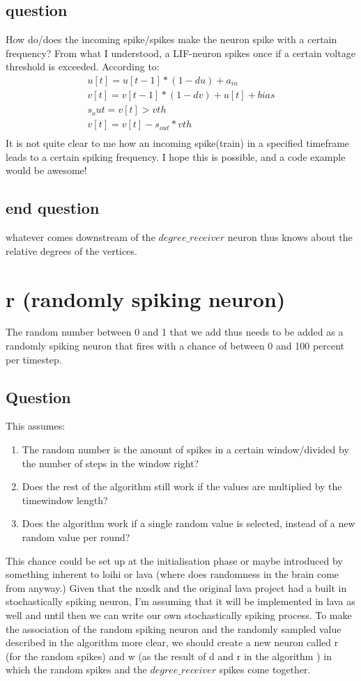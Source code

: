 \subsection{question}
How do/does the incoming spike/spikes make the neuron spike with a certain frequency? From what I understood, a LIF-neuron spikes once if a certain voltage threshold is exceeded. According to:
\begin{equation}
    \begin{split}
    u[t] = u[t-1] * (1-du) + a_{in} \\
    v[t] = v[t-1] * (1-dv) + u[t] + bias \\
    s_out = v[t] > vth \\
    v[t] = v[t] - s_{out}*vth \\
    \end{split}
\end{equation}
It is not quite clear to me how an incoming spike(train) in a specified timeframe leads to a certain spiking frequency. I hope this is possible, and a code example would be awesome!
\subsection{end question}
whatever comes downstream of the $degree\_receiver$ neuron thus knows about the relative degrees of the
vertices.


\section{r (randomly spiking neuron)}\label{sec:random}
The random number between 0 and 1 that we add thus needs to be added as a
randomly spiking neuron that fires with a chance of between 0 and 100 percent
per timestep. 
\subsection{Question}
This assumes:
\begin{enumerate}
    \item The random number is the amount of spikes in a certain window/divided by the number of steps in the window right?
    \item Does the rest of the algorithm still work if the values are multiplied by the timewindow length?
    \item Does the algorithm work if a single random value is selected, instead of a new random value per round?
\end{enumerate}
This chance could be set up at the initialisation phase or maybe
introduced by something inherent to loihi or lava (where does randomness in
the brain come from anyway.) Given that the nxsdk and the original lava project
had a built in stochastically spiking neuron, I'm assuming that it will be
implemented in lava as well and until then we can write our own stochastically
spiking process. To make the association of the random spiking neuron and the
randomly sampled value described in the algorithm more clear, we should
create a new neuron called r (for the random spikes) and w (as the result of d
and r in the algorithm ) in which the random spikes and the $degree\_receiver$
spikes come together.


